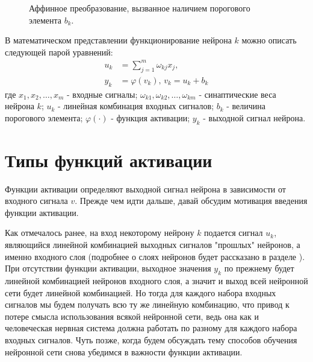 \documentclass[a4paper,12pt]{report}
\begin{document}
\begin{figure}[!h]
    \centering
    \caption{Аффинное преобразование, вызванное наличием порогового
    элемента $b_k$.} \label{fig:b_k}
\end{figure}

В математическом представлении функционирование нейрона $k$ можно
описать следующей парой уравнений:
\begin{equation}
    \begin{aligned}
        u_k &= \sum^{m}_{j=1}{\omega_{kj}x_j},\\
        y_k &= \varphi(v_k),\, v_k = u_k + b_k
    \end{aligned}
\end{equation}
где $x_1, x_2, \dots, x_m$ - входные сигналы; $\omega_{k1},
\omega_{k2}, \dots, \omega_{km}$ - синаптические веса нейрона $k$;
$u_k$ - линейная комбинация входных сигналов; $b_k$ - величина
порогового элемента; $\varphi(\cdot)$ - функция активации; $y_k$ -
выходной сигнал нейрона.

\section{Типы функций активации}
Функции активации определяют выходной сигнал нейрона в зависимости от
входного сигнала $v$. Прежде чем идти дальше, давай обсудим мотивация
введения функции активации.

Как отмечалось ранее, на вход некоторому нейрону $k$ подается сигнал
$u_k$, являющийся линейной комбинацией выходных сигналов "прошлых"
нейронов, а именно входного слоя
(подробнее о слоях нейронов будет рассказано в разделе
). При отсутствии функции
активации, выходное значения $y_k$ по прежнему будет линейной
комбинацией нейронов входного слоя, а значит и выход всей нейронной
сети будет линейной комбинацией. Но тогда для каждого набора входных
сигналов мы будем получать всю ту же линейную комбинацию, что привод к
потере смысла использования всякой нейронной сети, ведь она как и
человеческая нервная система должна работать по разному для каждого
набора входных сигналов. Чуть позже, когда будем
обсуждать тему способов обучения нейронной сети снова убедимся в
важности функции активации.
\end{document}
